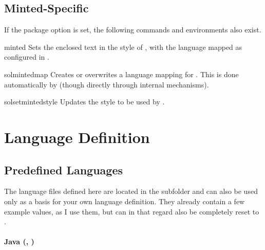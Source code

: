 \documentclass{sopra-base}
\begin{document}
\subsection{Minted-Specific}

If the package option  is set, the following commands and environments also exist.

\begin{environment}{minted}{}
    Sets the enclosed text in the style of , with the language mapped as configured in .
\end{environment}

\begin{command}{solmintedmap}{}
    Creates or overwrites a language mapping for .
    This is done automatically by  (though directly through internal mechanisms).
\end{command}

\begin{command}{solsetmintedstyle}{}
    Updates the style to be used by .
\end{command}

\clearpage
\appendix
\section{Language Definition}

\subsection{Predefined Languages}
\label{sec:vordefinierteSprachen}

The language files defined here are located in the subfolder  and can also be used only as a basis for your own language definition. They already contain a few example values, as I use them, but can in that regard also be completely
reset to . 

\paragraph{Java (, )}
\end{document}

